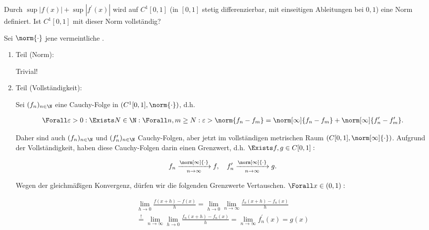 
\begin{exercise}

Durch $\sup |f(x)| + \sup |f^\prime(x)|$ wird auf $C^1[0, 1]$ (in $[0, 1]$ stetig differenzierbar, mit einseitigen Ableitungen bei $0, 1$) eine Norm definiert.
Ist $C^1[0, 1]$ mit dieser Norm vollständig?

\end{exercise}


\begin{solution}

Sei $\norm{\cdot}$ jene vermeintliche .

\begin{enumerate}[label = \arabic*.]

    \item Teil (Norm):

    Trivial!

    \item Teil (Vollständigkeit):
    
    Sei $(f_n)_{n \in \N}$ eine Cauchy-Folge in $(C^1[0, 1], \norm{\cdot})$, d.h.

    \begin{align*}
        \Forall \varepsilon > 0:
        \Exists N \in \N:
        \Forall n, m \geq N:
        \varepsilon > \norm{f_n - f_m} = \norm[\infty]{f_n - f_m} + \norm[\infty]{f_n^\prime - f_m^\prime}.
    \end{align*}

    Daher sind auch $(f_n)_{n \in \N}$ und $(f_n^\prime)_{n \in \N}$ Cauchy-Folgen, aber jetzt im vollständigen metrischen Raum $(C[0, 1], \norm[\infty]{\cdot})$.
    Aufgrund der Vollständigkeit, haben diese Cauchy-Folgen darin einen Grenzwert, d.h. $\Exists f, g \in C[0, 1]:$

    \begin{align*}
        f_n \xrightarrow[n \to \infty]{\norm[\infty]{\cdot}} f,
        \quad
        f_n^\prime \xrightarrow[n \to \infty]{\norm[\infty]{\cdot}} g.
    \end{align*}

    Wegen der gleichmäßigen Konvergenz, dürfen wir die folgenden Grenzwerte Vertauschen.
    $\Forall x \in (0, 1):$

    \begin{multline*}
        \lim_{h \to 0}
        \frac{f(x + h) - f(x)}{h}
        =
        \lim_{h \to 0}
        \lim_{n \to \infty}
        \frac{f_n(x + h) - f_n(x)}{h} \\
        \stackrel{!}{=}
        \lim_{n \to \infty}
        \lim_{h \to 0}
        \frac{f_n(x + h) - f_n(x)}{h}
        =
        \lim_{n \to \infty}
        f_n^\prime(x)
        =
        g(x)
    \end{multline*}


\end{enumerate}
\end{solution}
